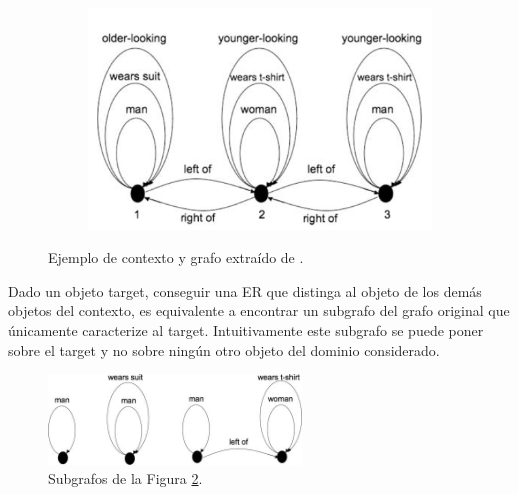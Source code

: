 \begin{figure}[!ht]
\begin{subfigure}{.50\textwidth}
\includegraphics[width=\textwidth]{images/grafo-survey.png}\\[0pt]
\label{grafo-survey}
\end{subfigure}
\caption{Ejemplo de contexto y grafo extra\'ido de \protect\cite{survey}.}\label{fig2-8}
\end{figure}



Dado un objeto target, conseguir una ER que distinga al objeto de los dem\'as objetos del contexto, es equivalente a encontrar un subgrafo del grafo original que \'unicamente caracterize al target. Intuitivamente este subgrafo se puede poner sobre el target y no sobre ning\'un otro objeto del dominio considerado.

\begin{figure}[ht]
\centering
\includegraphics[width=0.6\textwidth]{images/ref-exp-graph.png}
\caption{Subgrafos de la Figura \ref{fig2-8}.}
\label{ref-exp-graph}
\end{figure}

